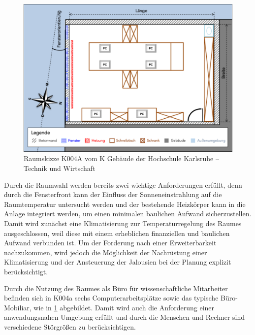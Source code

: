 \begin{figure}
\centering
\includegraphics[width=\textwidth]{abbildungen/20160102_k004a}
\caption[Raumskizze K004A vom K Gebäude der Hochschule Karlsruhe -- Technik und Wirtschaft]{Raumskizze K004A vom K Gebäude der Hochschule Karlsruhe -- Technik und Wirtschaft}
\label{fig:skizzek004a}
\end{figure}

Durch die Raumwahl werden bereits zwei wichtige Anforderungen erfüllt, denn durch die Fensterfront kann der Einfluss der Sonneneinstrahlung auf die Raumtemperatur untersucht werden und der bestehende Heizkörper kann in die Anlage integriert werden, um einen minimalen baulichen Aufwand sicherzustellen. Damit wird zunächst eine Klimatisierung zur Temperaturregelung des Raumes ausgeschlossen, weil diese mit einem erheblichen finanziellen und baulichen Aufwand verbunden ist. Um der Forderung nach einer Erweiterbarkeit nachzukommen, wird jedoch die Möglichkeit der Nachrüstung einer Klimatisierung und der Ansteuerung der Jalousien bei der Planung explizit berücksichtigt.

Durch die Nutzung des Raumes als Büro für wissenschaftliche Mitarbeiter befinden sich in K004a sechs Computerarbeitsplätze sowie das typische Büro-Mobiliar, wie in \ref{fig:skizzek004a} abgebildet. Damit wird auch die Anforderung einer anwendungsnahen Umgebung erfüllt und durch die Menschen und Rechner sind verschiedene Störgrößen zu berücksichtigen.

